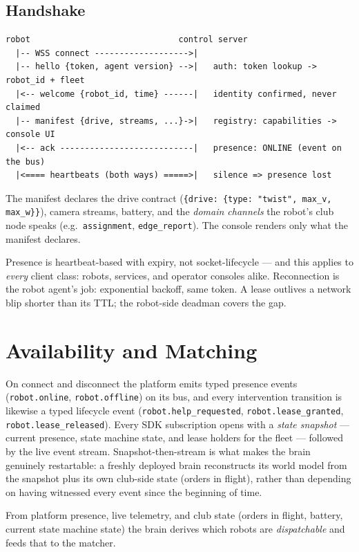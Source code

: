 \documentclass[11pt]{article}
\begin{document}
\subsection{Handshake}

\begin{lstlisting}
robot                              control server
  |-- WSS connect ------------------->|
  |-- hello {token, agent version} -->|   auth: token lookup -> robot_id + fleet
  |<-- welcome {robot_id, time} ------|   identity confirmed, never claimed
  |-- manifest {drive, streams, ...}->|   registry: capabilities -> console UI
  |<-- ack ---------------------------|   presence: ONLINE (event on the bus)
  |<==== heartbeats (both ways) =====>|   silence => presence lost
\end{lstlisting}

The manifest declares the drive contract
(\texttt{\{drive: \{type: "twist", max\_v, max\_w\}\}}), camera streams, battery, and
the \emph{domain channels} the robot's club node speaks (e.g.\ \texttt{assignment},
\texttt{edge\_report}). The console renders only what the manifest declares.

Presence is heartbeat-based with expiry, not socket-lifecycle --- and this applies to
\emph{every} client class: robots, services, and operator consoles alike.
Reconnection is the robot agent's job: exponential backoff, same token. A lease
outlives a network blip shorter than its TTL; the robot-side deadman covers the gap.

\section{Availability and Matching}
\label{sec:availability}

On connect and disconnect the platform emits typed presence events
(\texttt{robot.online}, \texttt{robot.offline}) on its bus, and every intervention
transition is likewise a typed lifecycle event (\texttt{robot.help\_requested},
\texttt{robot.lease\_granted}, \texttt{robot.lease\_released}). Every SDK
subscription opens with a \emph{state snapshot} --- current presence, state machine
state, and lease holders for the fleet --- followed by the live event stream.
Snapshot-then-stream is what makes the brain genuinely restartable: a freshly
deployed brain reconstructs its world model from the snapshot plus its own club-side
state (orders in flight), rather than depending on having witnessed every event since
the beginning of time.

From platform presence, live telemetry, and club state (orders in flight, battery,
current state machine state) the brain derives which robots are \emph{dispatchable}
and feeds that to the matcher.
\end{document}
